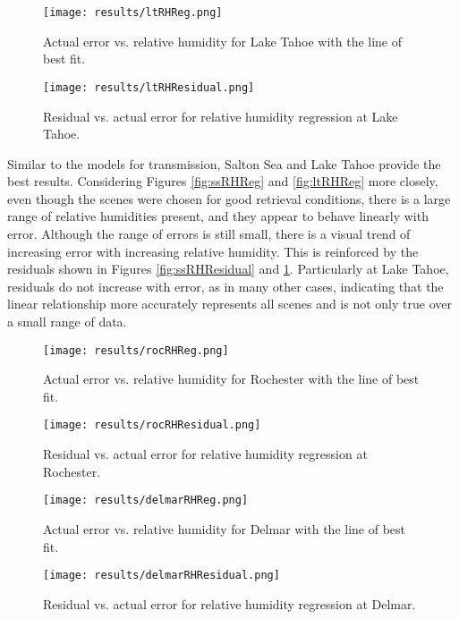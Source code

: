 \documentclass{book}
\begin{document}
\begin{figure}[H]
\begin{minipage}[b]{0.47\textwidth}
\centering
\texttt{[image: results/ltRHReg.png]}
\caption{Actual error vs. relative humidity for Lake Tahoe with the line of best fit.}
\label{fig:ltRHReg}
\end{minipage}
\begin{minipage}[b]{0.47\textwidth}
\centering
\texttt{[image: results/ltRHResidual.png]}
\caption{Residual vs. actual error for relative humidity regression at Lake Tahoe.}
\label{fig:ltRHResidual}
\end{minipage}
\end{figure}

Similar to the models for transmission, Salton Sea and Lake Tahoe provide the best results.  Considering Figures \ref{fig:ssRHReg} and \ref{fig:ltRHReg} more closely, even though the scenes were chosen for good retrieval conditions, there is a large range of relative humidities present, and they appear to behave linearly with error.  Although the range of errors is still small, there is a visual trend of increasing error with increasing relative humidity.  This is reinforced by the residuals shown in Figures \ref{fig:ssRHResidual} and \ref{fig:ltRHResidual}.  Particularly at Lake Tahoe, residuals do not increase with error, as in many other cases, indicating that the linear relationship more accurately represents all scenes and is not only true over a small range of data.

\begin{figure}[H]
\begin{minipage}[b]{0.47\textwidth}
\centering
\texttt{[image: results/rocRHReg.png]}
\caption{Actual error vs. relative humidity for Rochester with the line of best fit.}
\label{fig:rocRHReg}
\end{minipage}
\begin{minipage}[b]{0.47\textwidth}
\centering
\texttt{[image: results/rocRHResidual.png]}
\caption{Residual vs. actual error for relative humidity regression at Rochester.}
\label{fig:rocRHResidual}
\end{minipage}
\end{figure}

\begin{figure}[H]
\begin{minipage}[b]{0.47\textwidth}
\centering
\texttt{[image: results/delmarRHReg.png]}
\caption{Actual error vs. relative humidity for Delmar with the line of best fit.}
\label{fig:delmarRHReg}
\end{minipage}
\begin{minipage}[b]{0.47\textwidth}
\centering
\texttt{[image: results/delmarRHResidual.png]}
\caption{Residual vs. actual error for relative humidity regression at Delmar.}
\label{fig:delmarRHResidual}
\end{minipage}
\end{figure}
\end{document}
